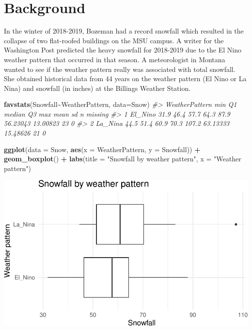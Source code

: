 \documentclass[
]{report}
\newenvironment{Shaded}{\begin{snugshade}}{\end{snugshade}}
\newcommand{\CommentTok}[1]{\textcolor[rgb]{0.56,0.35,0.01}{\textit{#1}}}
\newcommand{\DataTypeTok}[1]{\textcolor[rgb]{0.13,0.29,0.53}{#1}}
\newcommand{\KeywordTok}[1]{\textcolor[rgb]{0.13,0.29,0.53}{\textbf{#1}}}
\newcommand{\NormalTok}[1]{#1}
\newcommand{\OperatorTok}[1]{\textcolor[rgb]{0.81,0.36,0.00}{\textbf{#1}}}
\newcommand{\StringTok}[1]{\textcolor[rgb]{0.31,0.60,0.02}{#1}}
\begin{document}
\hypertarget{background}{%
\section{Background}\label{background}}

In the winter of 2018-2019, Bozeman had a record snowfall which resulted in the collapse of two flat-roofed buildings on the MSU campus. A writer for the Washington Post predicted the heavy snowfall for 2018-2019 due to the El Nino weather pattern that occurred in that season. A meteorologist in Montana wanted to see if the weather pattern really was associated with total snowfall. She obtained historical data from 44 years on the weather pattern (El Nino or La Nina) and snowfall (in inches) at the Billings Weather Station.

\begin{Shaded}
\begin{Highlighting}[]
\KeywordTok{favstats}\NormalTok{(Snowfall}\OperatorTok{\textasciitilde{}}\NormalTok{WeatherPattern, }\DataTypeTok{data=}\NormalTok{Snow)}
\CommentTok{\#\textgreater{}   WeatherPattern  min   Q1 median   Q3   max     mean       sd  n missing}
\CommentTok{\#\textgreater{} 1        El\_Nino 31.9 46.4   57.7 64.3  87.9 56.23043 13.00823 23       0}
\CommentTok{\#\textgreater{} 2        La\_Nina 44.5 51.4   60.9 70.3 107.2 63.13333 15.48626 21       0}
\end{Highlighting}
\end{Shaded}

\begin{Shaded}
\begin{Highlighting}[]
\KeywordTok{ggplot}\NormalTok{(}\DataTypeTok{data =}\NormalTok{ Snow,}
       \KeywordTok{aes}\NormalTok{(}\DataTypeTok{x =}\NormalTok{ WeatherPattern, }\DataTypeTok{y =}\NormalTok{ Snowfall)) }\OperatorTok{+}
\StringTok{    }\KeywordTok{geom\_boxplot}\NormalTok{() }\OperatorTok{+}\StringTok{ }
\StringTok{    }\KeywordTok{labs}\NormalTok{(}\DataTypeTok{title =} \StringTok{"Snowfall by weather pattern"}\NormalTok{,}
         \DataTypeTok{x =} \StringTok{"Weather pattern"}\NormalTok{)}
\end{Highlighting}
\end{Shaded}

\begin{center}\includegraphics[width=0.7\linewidth]{09-inference-2quant_files/figure-latex/unnamed-chunk-3-1} \end{center}
\end{document}
